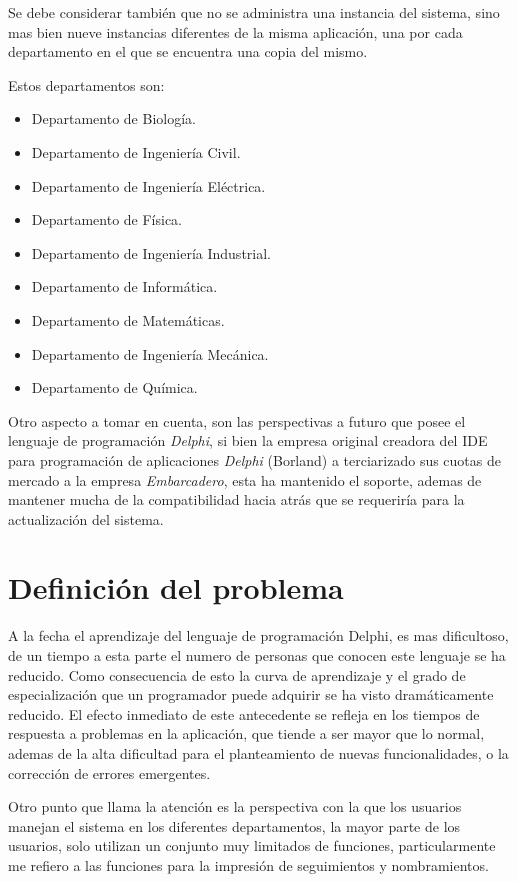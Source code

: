 \documentclass[letterpaper,11pt]{article}
\begin{document}
Se debe considerar también que no se administra una instancia del sistema, sino
mas bien nueve instancias diferentes de la misma aplicación, una por cada
departamento en el que se encuentra una copia del mismo.

Estos departamentos son:
\begin{itemize}
\item Departamento de Biología.
\item Departamento de Ingeniería Civil.
\item Departamento de Ingeniería Eléctrica.
\item Departamento de Física.
\item Departamento de Ingeniería Industrial.
\item Departamento de Informática.
\item Departamento de Matemáticas.
\item Departamento de Ingeniería Mecánica.
\item Departamento de Química.
\end{itemize}

Otro aspecto a tomar en cuenta, son las perspectivas a futuro que posee el
lenguaje de programación \emph{Delphi}, si bien la empresa original creadora
del IDE para programación de aplicaciones \emph{Delphi} (Borland) a
terciarizado sus cuotas de mercado a la empresa \emph{Embarcadero}, esta ha
mantenido el soporte, ademas de mantener mucha de la compatibilidad hacia atrás
que se requeriría para la actualización del sistema\cite{Delphi2}.

\section{Definición del problema}
A la fecha el aprendizaje del lenguaje de programación Delphi, es mas
dificultoso, de un tiempo a esta parte el numero de personas que conocen este
lenguaje se ha reducido. Como consecuencia de esto la curva de aprendizaje y
el grado de especialización que un programador puede adquirir se ha visto
dramáticamente reducido. El efecto inmediato de este antecedente se refleja en
los tiempos de respuesta a problemas en la aplicación, que tiende a ser mayor
que lo normal, ademas de la alta dificultad para el planteamiento de nuevas
funcionalidades, o la corrección de errores emergentes.

Otro punto que llama la atención es la perspectiva con la que los usuarios
manejan el sistema en los diferentes departamentos, la mayor parte de los
usuarios, solo utilizan un conjunto muy limitados de funciones, particularmente
me refiero a las funciones para la impresión de seguimientos y nombramientos.
\end{document}
